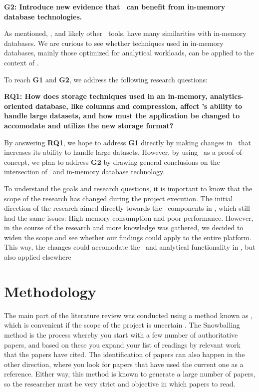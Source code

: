 \setlength{\leftskip}{1cm}

\textbf{G2: Introduce new evidence that \mde~can benefit from in-memory database technologies.}

\setlength{\leftskip}{0pt}

As mentioned, \gap, and likely other \mde~tools, have many similarities with in-memory databases. We are curious to see whether techniques used in in-memory databases, mainly those optimized for analytical workloads, can be applied to the context of \mde. 

To reach \textbf{G1} and \textbf{G2}, we address the following research questions:

\setlength{\leftskip}{1cm}

\textbf{RQ1: How does storage techniques used in an in-memory, analytics-oriented database, like columns and compression, affect \gap's ability to handle large datasets, and how must the application be changed to accomodate and utilize the new storage format?} 

\setlength{\leftskip}{0pt}

By answering \textbf{RQ1}, we hope to address \textbf{G1} directly by making changes in \gap~that increases its ability to handle large datasets. However, by using \gap~as a proof-of-concept, we plan to address \textbf{G2} by drawing general conclusions on the intersection of \mde~and in-memory database technology.

To understand the goals and research questions, it is important to know that the scope of the research has changed during the project execution. The initial direction of the research aimed directly towards the \bi~components in \gap, which still had the same issues: High memory consumption and poor performance. However, in the course of the research and more knowledge was gathered, we decided to widen the scope and see whether our findings could apply to the entire platform. This way, the changes could accomodate the \bi~and analytical functionality in \gap, but also applied elsewhere


\section{Methodology}
\label{sec:Methodology}
The main part of the literature review was conducted using a method known as , which is convenient if the scope of the project is uncertain \cite{Ang2014-nm}. The Snowballing method is the process whereby you start with a few number of authoritative papers, and based on these you expand your list of readings by relevant work that the papers have cited. The identification of papers can also happen in the other direction, where you look for papers that have used the current one as a reference. Either way, this method is known to generate a large number of papers, so the researcher must be very strict and objective in which papers to read.

